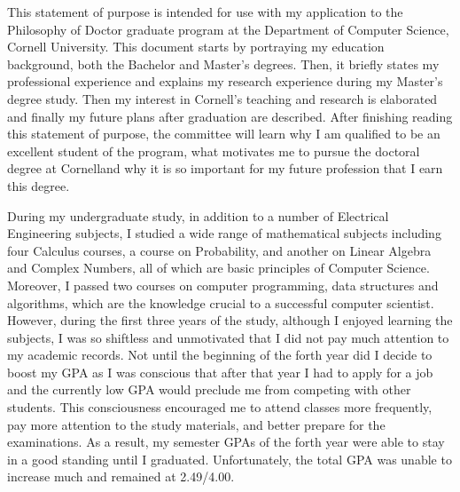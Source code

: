 \documentclass[a4paper,10pt]{report}
\newcommand{\university}{Cornell University}
\newcommand{\department}{Department of Computer Science}
\newcommand{\uniabbre}{Cornell}
\begin{document}

\vspace{0.8cm}
This statement of purpose is intended for use with my application to the Philosophy of Doctor graduate program at the \department, \university. This document starts by portraying my education background, both the Bachelor and Master's degrees. Then, it briefly states my professional experience and explains my research experience during my Master's degree study. Then my interest in \uniabbre's teaching and research is elaborated and finally my future plans after graduation are described. After finishing reading this statement of purpose, the committee will learn why I am qualified to be an excellent student of the program, what motivates me to pursue the doctoral degree at \uniabbre \space and why it is so important for my future profession that I earn this degree.

\vspace{0.2cm}
During my undergraduate study, in addition to a number of Electrical Engineering subjects, I studied a wide range of mathematical subjects including four Calculus courses, a course on Probability, and another on Linear Algebra and Complex Numbers, all of which are basic principles of Computer Science. Moreover, I passed two courses on computer programming, data structures and algorithms, which are the knowledge crucial to a successful computer scientist. However, during the first three years of the study, although I enjoyed learning the subjects, I was so shiftless and unmotivated that I did not pay much attention to my academic records. Not until the beginning of the forth year did I decide to boost my GPA as I was conscious that after that year I had to apply for a job and the currently low GPA would preclude me from competing with other students. This consciousness encouraged me to attend classes more frequently, pay more attention to the study materials, and better prepare for the examinations. As a result, my semester GPAs of the forth year were able to stay in a good standing until I graduated. Unfortunately, the total GPA was unable to increase much and remained at 2.49/4.00. 
\end{document}
